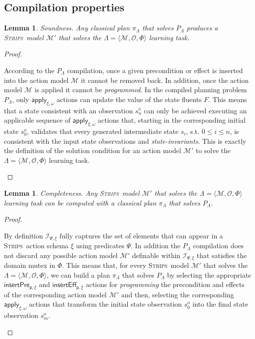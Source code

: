 \documentclass{article}
\newcommand{\tup}[1]{{\langle #1 \rangle}}
\newcommand{\strips}{\textsc{Strips}}
\newtheorem{mylemma}[mytheorem]{Lemma}
\begin{document}
\subsection{Compilation properties}
\begin{mylemma}
Soundness. Any classical plan $\pi_{\Lambda}$ that solves $P_{\Lambda}$ produces a \strips\ model $\mathcal{M'}$ that solves the $\Lambda=\tup{\mathcal{M},{\mathcal O},\Phi}$ learning task.
\end{mylemma}

\begin{proof}[Proof]
\begin{small}
According to the $P_{\Lambda}$ compilation, once a given precondition or effect is inserted into the action model $\mathcal{M}$ it cannot be removed back. In addition, once the action model $\mathcal{M}$ is applied it cannot be {\em programmed}. In the compiled planning problem $P_{\Lambda}$, only $\mathsf{apply_{\xi,\omega}}$ actions can update the value of the state fluents $F$. This means that a state consistent with an observation $s_n^o$ can only be achieved executing an applicable sequence of $\mathsf{apply_{\xi,\omega}}$ actions that, starting in the corresponding initial state $s_0^o$, validates that every generated intermediate state $s_i$, s.t. $0\leq i\leq n$, is consistent with the input state observations and {\em state-invariants}. This is exactly the definition of the solution condition for an action model $\mathcal{M}'$ to solve the $\Lambda=\tup{\mathcal{M},{\mathcal O},\Phi}$ learning task.
\end{small}
\end{proof}

\begin{mylemma}
Completeness. Any \strips\ model $\mathcal{M}'$ that solves the $\Lambda=\tup{\mathcal{M},{\mathcal O},\Phi}$ learning task can be computed with a classical plan $\pi_{\Lambda}$ that solves $P_{\Lambda}$.
\end{mylemma}

\begin{proof}[Proof]
\begin{small}
By definition ${\mathcal I}_{\Psi,\xi}$ fully captures the set of elements that can appear in a \strips\ action schema $\xi$ using predicates $\Psi$. In addition the $P_{\Lambda}$ compilation does not discard any possible action model $\mathcal{M}'$ definable within ${\mathcal I}_{\Psi,\xi}$ that satisfies the domain mutex in $\Phi$. This means that, for every \strips\ model $\mathcal{M}'$ that solves the $\Lambda=\tup{\mathcal{M},{\mathcal O},\Phi}$, we can build a plan $\pi_{\Lambda}$ that solves $P_{\Lambda}$ by selecting the appropriate $\mathsf{insertPre_{p,\xi}}$ and $\mathsf{insertEff_{p,\xi}}$ actions for {\em programming} the precondition and effects of the corresponding action model $\mathcal{M}'$ and then, selecting the corresponding $\mathsf{apply_{\xi,\omega}}$ actions that transform the initial state observation $s_0^o$ into the final state observation $s_m^o$.
\end{small}
\end{proof}
\end{document}
